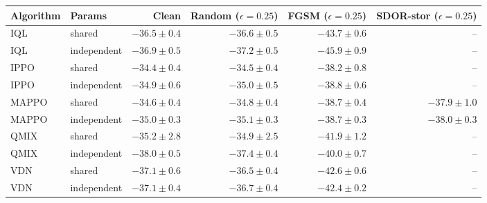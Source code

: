 \begin{tabular}{llrrrr}
\toprule
Algorithm & Params & Clean & Random ($\epsilon=0.25$) & FGSM ($\epsilon=0.25$) & SDOR-stor ($\epsilon=0.25$) \\
\midrule
IQL & shared & $-36.5\pm0.4$ & $-36.6\pm0.5$ & $-43.7\pm0.6$ & -- \\
IQL & independent & $-36.9\pm0.5$ & $-37.2\pm0.5$ & $-45.9\pm0.9$ & -- \\
\midrule
IPPO & shared & $-34.4\pm0.4$ & $-34.5\pm0.4$ & $-38.2\pm0.8$ & -- \\
IPPO & independent & $-34.9\pm0.6$ & $-35.0\pm0.5$ & $-38.8\pm0.6$ & -- \\
\midrule
MAPPO & shared & $-34.6\pm0.4$ & $-34.8\pm0.4$ & $-38.7\pm0.4$ & $-37.9\pm1.0$ \\
MAPPO & independent & $-35.0\pm0.3$ & $-35.1\pm0.3$ & $-38.7\pm0.3$ & $-38.0\pm0.3$ \\
\midrule
QMIX & shared & $-35.2\pm2.8$ & $-34.9\pm2.5$ & $-41.9\pm1.2$ & -- \\
QMIX & independent & $-38.0\pm0.5$ & $-37.4\pm0.4$ & $-40.0\pm0.7$ & -- \\
\midrule
VDN & shared & $-37.1\pm0.6$ & $-36.5\pm0.4$ & $-42.6\pm0.6$ & -- \\
VDN & independent & $-37.1\pm0.4$ & $-36.7\pm0.4$ & $-42.4\pm0.2$ & -- \\
\bottomrule
\end{tabular}